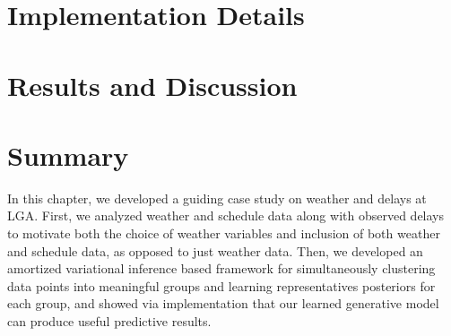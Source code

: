 \section{Implementation Details}
\label{sec:atrds-implementation}


\section{Results and Discussion}
\label{sec:atrds-results}


\section{Summary}
\label{sec:atrds-summary}

In this chapter, we developed a guiding case study on weather and delays at LGA. First, we analyzed weather and schedule data along with observed delays to motivate both the choice of weather variables and inclusion of both weather and schedule data, as opposed to just weather data. Then, we developed an amortized variational inference based framework for simultaneously clustering data points into meaningful groups and learning representatives posteriors for each group, and showed via implementation that our learned generative model can produce useful predictive results.